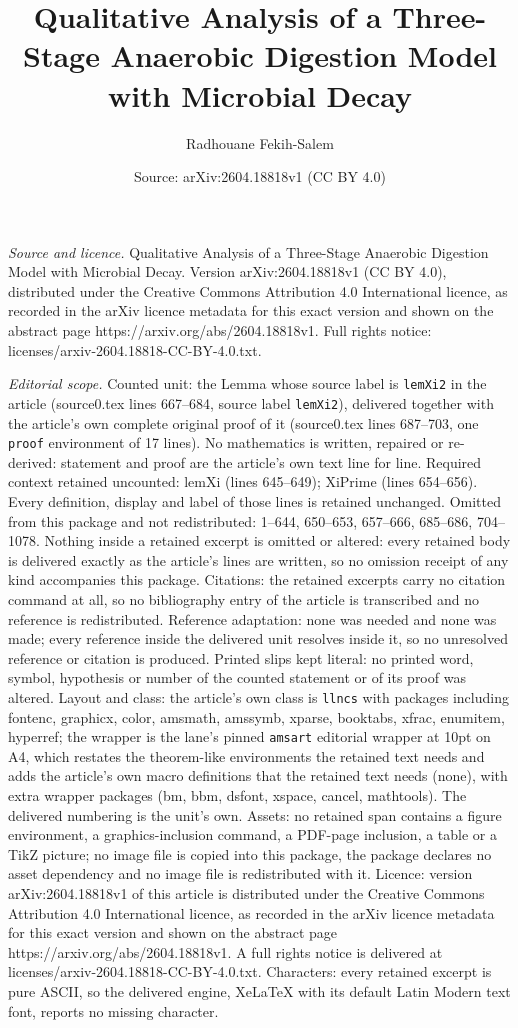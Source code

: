 \documentclass[10pt,a4paper]{amsart}
\title[Qualitative Analysis of a Three-Stage Anaerobic Digestion Mo]{Qualitative Analysis of a Three-Stage Anaerobic Digestion Model with Microbial Decay}
\author{Radhouane Fekih-Salem}
\date{Source: arXiv:2604.18818v1 (CC BY 4.0)}
\begin{document}
\maketitle

\noindent\emph{Source and licence.} Qualitative Analysis of a Three-Stage Anaerobic Digestion Model with Microbial Decay. Version arXiv:2604.18818v1 (CC BY 4.0), distributed under the Creative Commons Attribution 4.0 International licence, as recorded in the arXiv licence metadata for this exact version and shown on the abstract page https://arxiv.org/abs/2604.18818v1. Full rights notice: licenses/arxiv-2604.18818-CC-BY-4.0.txt.\par\smallskip

\noindent\textit{Editorial scope.} Counted unit: the Lemma whose source label is \texttt{lemXi2} in the article (source0.tex lines 667--684, source label \texttt{lemXi2}), delivered together with the article's own complete original proof of it (source0.tex lines 687--703, one \texttt{proof} environment of 17 lines). No mathematics is written, repaired or re-derived: statement and proof are the article's own text line for line. Required context retained uncounted: lemXi (lines 645--649); XiPrime (lines 654--656). Every definition, display and label of those lines is retained unchanged. Omitted from this package and not redistributed: 1--644, 650--653, 657--666, 685--686, 704--1078. Nothing inside a retained excerpt is omitted or altered: every retained body is delivered exactly as the article's lines are written, so no omission receipt of any kind accompanies this package. Citations: the retained excerpts carry no citation command at all, so no bibliography entry of the article is transcribed and no reference is redistributed. Reference adaptation: none was needed and none was made; every reference inside the delivered unit resolves inside it, so no unresolved reference or citation is produced. Printed slips kept literal: no printed word, symbol, hypothesis or number of the counted statement or of its proof was altered. Layout and class: the article's own class is \texttt{llncs} with packages including fontenc, graphicx, color, amsmath, amssymb, xparse, booktabs, xfrac, enumitem, hyperref; the wrapper is the lane's pinned \texttt{amsart} editorial wrapper at 10pt on A4, which restates the theorem-like environments the retained text needs and adds the article's own macro definitions that the retained text needs (none), with extra wrapper packages (bm, bbm, dsfont, xspace, cancel, mathtools). The delivered numbering is the unit's own. Assets: no retained span contains a figure environment, a graphics-inclusion command, a PDF-page inclusion, a table or a TikZ picture; no image file is copied into this package, the package declares no asset dependency and no image file is redistributed with it. Licence: version arXiv:2604.18818v1 of this article is distributed under the Creative Commons Attribution 4.0 International licence, as recorded in the arXiv licence metadata for this exact version and shown on the abstract page https://arxiv.org/abs/2604.18818v1. A full rights notice is delivered at licenses/arxiv-2604.18818-CC-BY-4.0.txt. Characters: every retained excerpt is pure ASCII, so the delivered engine, XeLaTeX with its default Latin Modern text font, reports no missing character.
\end{document}
